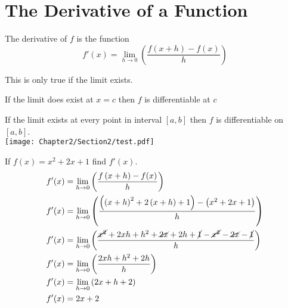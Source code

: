
\section{The Derivative of a Function}
\begin{theorem}[Derivative]
    The derivative of $f$ is the function
    \begin{equation}
        f'(x) = \lim_{h \to 0}\left(\dfrac{f\left(x + h\right) - f(x)}{h}\right)
    \end{equation}
\end{theorem}
\begin{remark}
    This is only true if the limit exists.
\end{remark}
\begin{corollary}
    If the limit does exist at $x=c$ then $f$ is differentiable at $c$
\end{corollary}
\begin{corollary}
    If the limit exists at every point in interval $\left[a, b\right]$ then $f$ is differentiable on $\left[a, b\right]$. \\
    \texttt{[image: Chapter2/Section2/test.pdf]}
\end{corollary}
\begin{example}
    If $f(x) = x^2 + 2x + 1$ find $f'(x)$.
    \begin{align*}
        f'(x) &= \lim_{h \to 0}\left(\dfrac{f\left(x + h\right) - f(x)}{h}\right) \\
        f'(x) &= \lim_{h \to 0}\left(\dfrac{\left(\left(x+h\right)^2 + 2\left(x + h\right) +1 \right) - \left(x^2 + 2x + 1\right)}{h}\right)\\
        f'(x) &= \lim_{h \to 0}\left(\dfrac{\cancel{x^2} + 2xh + h^2 + \cancel{2x} + 2h + \cancel{1} - \cancel{x^2} - \cancel{2x} - \cancel{1}}{h} \right) \\
        f'(x) &= \lim_{h \to 0}\left( \dfrac{2xh + h^2 + 2h}{h} \right) \\
        f'(x) &= \lim_{h \to 0}\left( 2x + h + 2 \right) \\
        f'(x) &= 2x + 2
    \end{align*}
\end{example}
